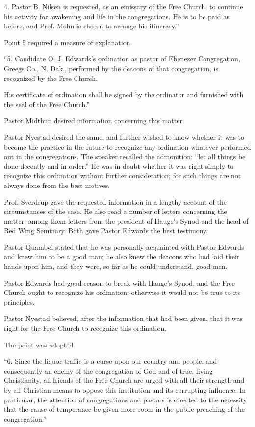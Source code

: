 4. Pastor B. Nilsen is requested, as an emissary of the Free Church, to continue his activity for awakening and life in the congregations. He is to be paid as before, and Prof. Mohn is chosen to arrange his itinerary.”

Point 5 required a measure of explanation.

“5. Candidate O. J. Edwards’s ordination as pastor of Ebenezer Congregation, Greegs Co., N. Dak., performed by the deacons of that congregation, is recognized by the Free Church.

His certificate of ordination shall be signed by the ordinator and furnished with the seal of the Free Church.”

Pastor Midthun desired information concerning this matter.

Pastor Nyestad desired the same, and further wished to know whether it was to become the practice in the future to recognize any ordination whatever performed out in the congregations. The speaker recalled the admonition: “let all things be done decently and in order.” He was in doubt whether it was right simply to recognize this ordination without further consideration; for such things are not always done from the best motives.

Prof. Sverdrup gave the requested information in a lengthy account of the circumstances of the case. He also read a number of letters concerning the matter, among them letters from the president of Hauge’s Synod and the head of Red Wing Seminary. Both gave Pastor Edwards the best testimony.

Pastor Quambøl stated that he was personally acquainted with Pastor Edwards and knew him to be a good man; he also knew the deacons who had laid their hands upon him, and they were, so far as he could understand, good men.

Pastor Edwards had good reason to break with Hauge’s Synod, and the Free Church ought to recognize his ordination; otherwise it would not be true to its principles.

Pastor Nyestad believed, after the information that had been given, that it was right for the Free Church to recognize this ordination.

The point was adopted.

“6. Since the liquor traffic is a curse upon our country and people, and consequently an enemy of the congregation of God and of true, living Christianity, all friends of the Free Church are urged with all their strength and by all Christian means to oppose this institution and its corrupting influence. In particular, the attention of congregations and pastors is directed to the necessity that the cause of temperance be given more room in the public preaching of the congregation.”

